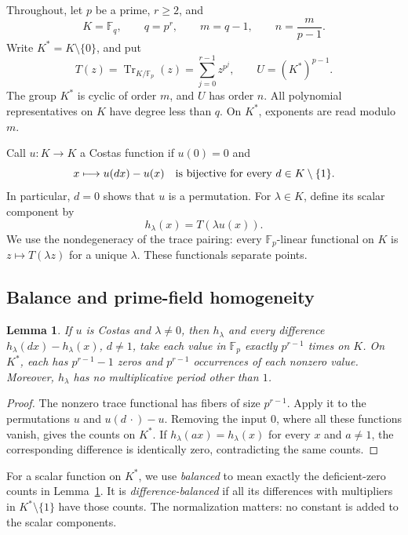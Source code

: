 \documentclass[11pt]{article}
\newtheorem{lemma}[theorem]{Lemma}
\theoremstyle{definition}
\theoremstyle{remark}
\newcommand{\Fp}{\mathbb F_p}
\newcommand{\Fq}{\mathbb F_q}
\newcommand{\Tr}{\operatorname{Tr}}
\numberwithin{equation}{section}
\begin{document}
Throughout, let \(p\) be a prime, \(r\geq2\), and
\[
 K=\Fq,\qquad q=p^r,\qquad m=q-1,\qquad
 n=\frac{m}{p-1}.
\]
Write \(K^*=K\setminus\{0\}\), and put
\[
 T(z)=\Tr_{K/\Fp}(z)=\sum_{j=0}^{r-1}z^{p^j},
 \qquad U=(K^*)^{p-1}.
\]
The group \(K^*\) is cyclic of order \(m\), and \(U\) has order \(n\).
All polynomial representatives on \(K\) have degree less than \(q\).
On \(K^*\), exponents are read modulo \(m\).

Call \(u:K\to K\) a Costas function if \(u(0)=0\) and
\begin{equation}\label{eq:costas}
 x\longmapsto u(dx)-u(x)
 \quad\hbox{is bijective for every }d\in K\setminus\{1\}.
\end{equation}
In particular, \(d=0\) shows that \(u\) is a permutation. For
\(\lambda\in K\), define its scalar component by
\[
 h_\lambda(x)=T(\lambda u(x)).
\]
We use the nondegeneracy of the trace pairing: every \(\Fp\)-linear
functional on \(K\) is \(z\mapsto T(\lambda z)\) for a unique \(\lambda\).
These functionals separate points.

\subsection{Balance and prime-field homogeneity}

\begin{lemma}\label{lem:balance}
If \(u\) is Costas and \(\lambda\ne0\), then \(h_\lambda\) and every
difference \(h_\lambda(dx)-h_\lambda(x)\), \(d\ne1\), take each value in
\(\Fp\) exactly \(p^{r-1}\) times on \(K\).
On \(K^*\), each has \(p^{r-1}-1\) zeros and \(p^{r-1}\) occurrences of
each nonzero value. Moreover, \(h_\lambda\) has no multiplicative period
other than \(1\).
\end{lemma}
\begin{proof}
The nonzero trace functional has fibers of size \(p^{r-1}\).
Apply it to the permutations \(u\) and \(u(d\,\cdot)-u\).
Removing the input \(0\), where all these functions vanish, gives the
counts on \(K^*\). If \(h_\lambda(ax)=h_\lambda(x)\) for every \(x\) and
\(a\ne1\), the corresponding difference is identically zero, contradicting
the same counts.
\end{proof}

For a scalar function on \(K^*\), we use \emph{balanced} to mean exactly
the deficient-zero counts in Lemma~\ref{lem:balance}. It is
\emph{difference-balanced} if all its differences with multipliers
in \(K^*\setminus\{1\}\) have those counts. The normalization matters:
no constant is added to the scalar components.
\end{document}
